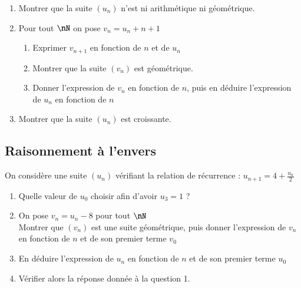 \documentclass[oneside,12pt]{article}          %
\begin{document}
\begin{enumerate}
    \item Montrer que la suite $(u_n)$ n'est ni arithmétique ni géométrique.
    \item Pour tout $\nN$ on pose $v_n=u_n+n+1$
    \begin{enumerate}
        \item Exprimer $v_{n+1}$ en fonction de $n$ et de $u_n$
        \item Montrer que la suite $(v_n)$ est géométrique.
        \item Donner l'expression de $v_n$ en fonction de $n$, puis en déduire l'expression de $u_n$ en fonction de $n$
    \end{enumerate}
    \item Montrer que la suite $(u_n)$ est croissante.
\end{enumerate}



\subsection{Raisonnement à l'envers}
On considère une suite $(u_n)$ vérifiant la relation de récurrence : $u_{n+1}=4+\frac{u_n}{2}$
\begin{enumerate}
    \item Quelle valeur de $u_{0}$ choisir afin d'avoir $u_{3}=1$ ?
    \item On pose $v_n=u_n-8$ pour tout $\nN$ \\
    Montrer que $(v_n)$ est une suite géométrique, puis donner l'expression de $v_{n}$ en fonction de $n$ et de son premier terme $v_{0}$ 
    \item En déduire l'expression de $u_n$ en fonction de $n$ et de son premier terme $u_{0}$
    \item Vérifier alors la réponse donnée à la question 1.
\end{enumerate}
\end{document}
